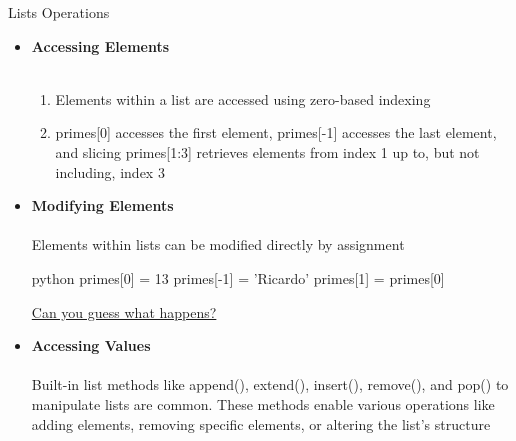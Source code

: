 \documentclass[
	11pt, 
]{beamer}
\begin{document}
\begin{frame}[fragile]{Lists Operations}
\scriptsize
\begin{itemize}
    \item \textbf{Accessing Elements} \\ \\ \smallskip
    \begin{enumerate}
        \item  Elements within a list are accessed using zero-based indexing \\
    
        \item  primes[0] accesses the first element, primes[-1] accesses the last element, and slicing primes[1:3] retrieves elements from index 1 up to, but not including, index 3

    \end{enumerate}
    \smallskip
    
    \item \textbf{Modifying Elements} \\ \\ \smallskip
    Elements within lists can be modified directly by assignment

    \begin{mintedbox}{python}
primes[0] = 13  
primes[-1] = 'Ricardo'
primes[1] = primes[0]
    \end{mintedbox}
     \underline{Can you guess what happens?} \smallskip

    \item \textbf{Accessing Values} \\ \\ \smallskip
     Built-in list methods like append(), extend(), insert(), remove(), and pop() to manipulate lists are common. These methods enable various operations like adding elements, removing specific elements, or altering the list's structure

\end{itemize}
\end{frame}

\end{document}
